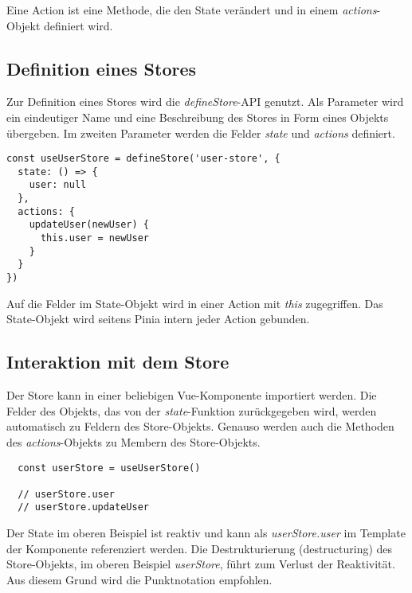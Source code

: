 Eine Action ist eine Methode, die den State verändert und in einem \textit{actions}-Objekt definiert wird.

\subsection{Definition eines Stores}

Zur Definition eines Stores wird die \textit{defineStore}-API genutzt. Als Parameter wird ein eindeutiger Name und eine Beschreibung des Stores in Form eines Objekts übergeben. Im zweiten Parameter werden die Felder \textit{state} und \textit{actions} definiert.

\begin{lstlisting}
const useUserStore = defineStore('user-store', {
  state: () => {
    user: null
  },
  actions: {
    updateUser(newUser) {
      this.user = newUser
    }
  }
})
\end{lstlisting}

Auf die Felder im State-Objekt wird in einer Action mit \textit{this} zugegriffen. Das State-Objekt wird seitens Pinia intern jeder Action gebunden.

\subsection{Interaktion mit dem Store}

Der Store kann in einer beliebigen Vue-Komponente importiert werden. Die Felder des Objekts, das von der \textit{state}-Funktion zurückgegeben wird, werden automatisch zu Feldern des Store-Objekts. Genauso werden auch die Methoden des \textit{actions}-Objekts zu Membern des Store-Objekts.

\begin{lstlisting}
  const userStore = useUserStore()
  
  // userStore.user
  // userStore.updateUser
\end{lstlisting}

Der State im oberen Beispiel ist reaktiv und kann als \textit{userStore.user} im Template der Komponente referenziert werden. Die Destrukturierung (destructuring) des Store-Objekts, im oberen Beispiel \textit{userStore}, führt zum Verlust der Reaktivität. Aus diesem Grund wird die Punktnotation empfohlen.\cite{piniaDefiningAStore}
